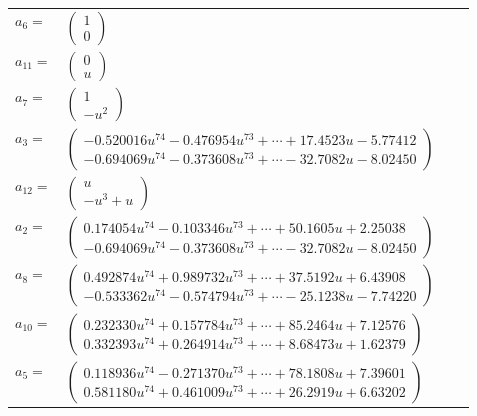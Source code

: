 \documentclass[1p]{elsarticle_modified}
\theoremstyle{definition}
\begin{document}
\begin{tabular}{m{7pt} m{180pt} m{7pt} m{180pt} }
\flushright $a_{6}=$&$\begin{pmatrix}1\\0\end{pmatrix}$ \\
\flushright $a_{11}=$&$\begin{pmatrix}0\\u\end{pmatrix}$ \\
\flushright $a_{7}=$&$\begin{pmatrix}1\\- u^2\end{pmatrix}$ \\
\flushright $a_{3}=$&$\begin{pmatrix}-0.520016 u^{74}-0.476954 u^{73}+\cdots+17.4523 u-5.77412\\-0.694069 u^{74}-0.373608 u^{73}+\cdots-32.7082 u-8.02450\end{pmatrix}$ \\
\flushright $a_{12}=$&$\begin{pmatrix}u\\- u^3+u\end{pmatrix}$ \\
\flushright $a_{2}=$&$\begin{pmatrix}0.174054 u^{74}-0.103346 u^{73}+\cdots+50.1605 u+2.25038\\-0.694069 u^{74}-0.373608 u^{73}+\cdots-32.7082 u-8.02450\end{pmatrix}$ \\
\flushright $a_{8}=$&$\begin{pmatrix}0.492874 u^{74}+0.989732 u^{73}+\cdots+37.5192 u+6.43908\\-0.533362 u^{74}-0.574794 u^{73}+\cdots-25.1238 u-7.74220\end{pmatrix}$ \\
\flushright $a_{10}=$&$\begin{pmatrix}0.232330 u^{74}+0.157784 u^{73}+\cdots+85.2464 u+7.12576\\0.332393 u^{74}+0.264914 u^{73}+\cdots+8.68473 u+1.62379\end{pmatrix}$ \\
\flushright $a_{5}=$&$\begin{pmatrix}0.118936 u^{74}-0.271370 u^{73}+\cdots+78.1808 u+7.39601\\0.581180 u^{74}+0.461009 u^{73}+\cdots+26.2919 u+6.63202\end{pmatrix}$ \\

\end{tabular}
\end{document}
